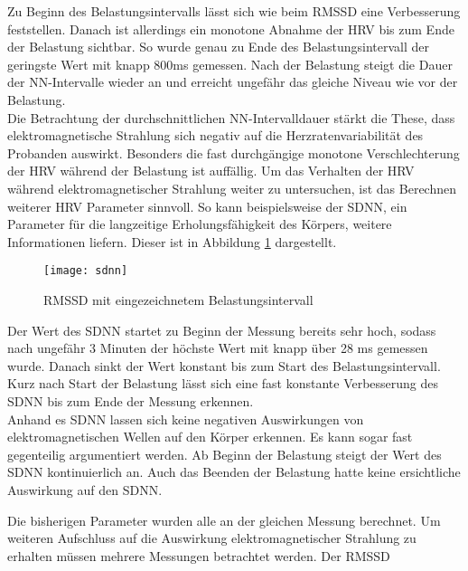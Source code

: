 Zu Beginn des Belastungsintervalls lässt sich wie beim RMSSD eine Verbesserung feststellen. Danach ist allerdings ein monotone Abnahme der HRV bis zum Ende der Belastung sichtbar. So wurde genau zu Ende des Belastungsintervall der geringste Wert mit knapp 800ms gemessen. Nach der Belastung steigt die Dauer der NN-Intervalle wieder an und erreicht ungefähr das gleiche Niveau wie vor der Belastung. \\
Die Betrachtung der durchschnittlichen NN-Intervalldauer stärkt die These, dass elektromagnetische Strahlung sich negativ auf die Herzratenvariabilität des Probanden auswirkt. Besonders die fast durchgängige monotone Verschlechterung der HRV während der Belastung ist auffällig. Um das Verhalten der HRV während elektromagnetischer Strahlung weiter zu untersuchen, ist das Berechnen weiterer HRV Parameter sinnvoll. So kann beispielsweise der SDNN, ein Parameter für die langzeitige Erholungsfähigkeit des Körpers, weitere Informationen liefern. Dieser ist in Abbildung \ref{fig:sdnn} dargestellt.
\begin{figure}[H]
	\centering
	\texttt{[image: sdnn]}
	\caption{RMSSD mit eingezeichnetem Belastungsintervall }
	\label{fig:sdnn}
\end{figure}


Der Wert des SDNN startet zu Beginn der Messung bereits sehr hoch, sodass nach ungefähr 3 Minuten der höchste Wert mit knapp über 28 ms gemessen wurde. Danach sinkt der Wert konstant bis zum Start des Belastungsintervall. Kurz nach Start der Belastung lässt sich eine fast konstante Verbesserung des SDNN bis zum Ende der Messung erkennen. \\
Anhand es SDNN lassen sich keine negativen Auswirkungen von elektromagnetischen Wellen auf den Körper erkennen. Es kann sogar fast gegenteilig argumentiert werden. Ab Beginn der Belastung steigt der Wert des SDNN kontinuierlich an. Auch das Beenden der Belastung hatte keine ersichtliche Auswirkung auf den SDNN. 

Die bisherigen Parameter wurden alle an der gleichen Messung berechnet. Um weiteren Aufschluss auf die Auswirkung elektromagnetischer Strahlung zu erhalten müssen mehrere Messungen betrachtet werden. Der RMSSD 

